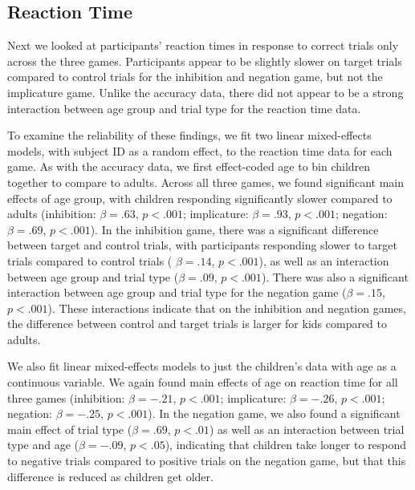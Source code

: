 \documentclass[10pt,letterpaper]{article}
\begin{document}
\subsection{Reaction Time}

Next we looked at participants' reaction times in response to correct trials only across the three games.  Participants appear to be slightly slower on target trials compared to control trials for the inhibition and negation game, but not the implicature game.  Unlike the accuracy data, there did not appear to be a strong interaction between age group and trial type for the reaction time data.  

To examine the reliability of these findings, we fit two linear mixed-effects models, with subject ID as a random effect, to the reaction time data for each game.  As with the accuracy data, we first effect-coded age to bin children together to compare to adults.  Across all three games, we found significant main effects of age group, with children responding significantly slower compared to adults (inhibition: $\beta = .63$, $p< .001$; implicature: $\beta = .93$, $p< .001$; negation: $\beta = .69$, $p< .001$).  In the inhibition game, there was a significant difference between target and control trials, with participants responding slower to target trials compared to control trials ( $\beta = .14$, $p< .001$), as well as an interaction between age group and trial type ($\beta = .09$, $p< .001$).  There was also a significant interaction between age group and trial type for the negation game ($\beta = .15$, $p< .001$).  These interactions indicate that on the inhibition and negation games, the difference between control and target trials is larger for kids compared to adults.  

We also fit linear mixed-effects models to just the children's data with age as a continuous variable.  We again found main effects of age on reaction time for all three games (inhibition: $\beta = -.21$, $p< .001$; implicature: $\beta = -.26$, $p< .001$; negation: $\beta = -.25$, $p< .001$).  In the negation game, we also found a significant main effect of trial type ($\beta = .69$, $p< .01$) as well as an interaction between trial type and age ($\beta = -.09$, $p< .05$), indicating that children take longer to respond to negative trials compared to positive trials on the negation game, but that this difference is reduced as children get older.  
\end{document}

